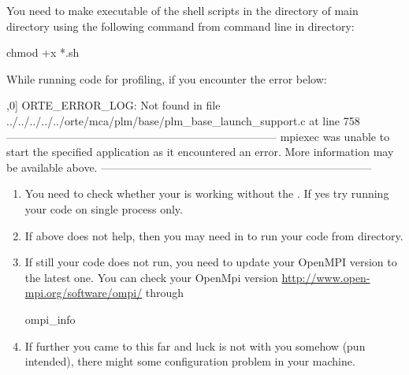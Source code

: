 \begin{solution}
You need to make executable of the shell scripts in 
the  directory of  main directory using the following command from 
command line in  directory:
\begin{Code}
chmod +x *.sh
\end{Code}  
\end{solution}


\begin{problem}
While running  code for profiling, if you 
encounter the error below:
\begin{Output}
[G:12221] [[39704,0],0] ORTE_ERROR_LOG: Not found in file ../../../../../orte/mca/plm/base/plm_base_launch_support.c at line 758
--------------------------------------------------------------------------
mpiexec was unable to start the specified application as it encountered an error.
More information may be available above.
--------------------------------------------------------------------------
\end{Output}  
\end{problem}

\begin{solution}
\begin{enumerate}
\item You need to check whether your  is working without the . If yes try running your  code on single process only.
\item If above does not help, then you may need  in  to run your code from  directory.
\item If still your code does not run, you need to update your OpenMPI version to the latest one. You can check your OpenMpi version \url{http://www.open-mpi.org/software/ompi/} through 
\begin{Output}
ompi_info
\end{Output}
\item If further you came to this far and luck is not with you somehow (pun intended), there might some configuration problem in your machine.
\end{enumerate}  
\end{solution}

